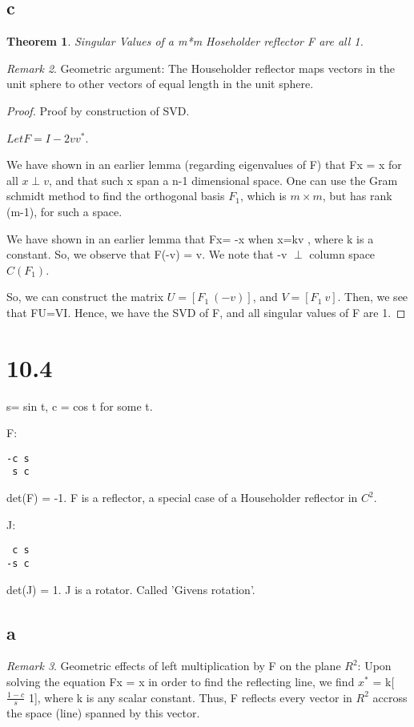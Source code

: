 \documentclass[10pt]{amsart}
\newtheorem{thm}{Theorem}[subsection]
\theoremstyle{remark}
\newtheorem{rem}[thm]{Remark}
\begin{document}
\subsection{c}
\begin{thm}
 Singular Values of a m*m Hoseholder reflector F are all 1.
\end{thm}
\begin{rem}
 Geometric argument: The Householder reflector maps vectors in the unit sphere to other vectors of equal length in the unit sphere.
\end{rem}
\begin{proof}
Proof by construction of SVD.

$Let F = I - 2vv^{*}$.

We have shown in an earlier lemma (regarding eigenvalues of F) that Fx = x for all $x \perp v$, and that such x span a n-1 dimensional space. One can use the Gram schmidt method to find the orthogonal basis $F_{1}$, which is $m\times m$, but has rank (m-1), for such a space.

We have shown in an earlier lemma that Fx= -x when x=kv , where k is a constant. So, we observe that F(-v) = v. We note that -v $\perp$ column space $C(F_{1})$.

So, we can construct the matrix $U=[F_{1}\ (-v)]$, and $V = [F_{1}\ v]$. Then, we see that FU=VI. Hence, we have the SVD of F, and all singular values of F are 1.
\end{proof}


\section{10.4}
s= sin t, c = cos t for some t. 

F:
\begin{verbatim}
-c s
 s c
\end{verbatim}
det(F) = -1. F is a reflector, a special case of a Householder reflector in $C^{2}$.


J:
\begin{verbatim}
 c s
-s c
\end{verbatim}
det(J) = 1. J is a rotator. Called 'Givens rotation'.

\subsection{a}
\begin{rem}
Geometric effects of left multiplication by F on the plane $R^{2}$:
Upon solving the equation Fx = x in order to find the reflecting line, we find $x^{*}$ = k[$\frac{1-c}{s}$ 1], where k is any scalar constant. Thus, F reflects every vector in $R^{2}$ accross the space (line) spanned by this vector.
\end{rem}
\end{document}
